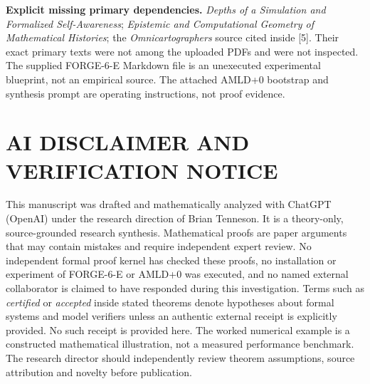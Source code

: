 \documentclass[11pt,letterpaper]{article}
\theoremstyle{definition}
\theoremstyle{remark}
\newcommand{\src}[1]{\textup{[#1]}}
\begin{document}
\noindent\textbf{Explicit missing primary dependencies.} \emph{Depths of a Simulation and Formalized Self-Awareness}; \emph{Epistemic and Computational Geometry of Mathematical Histories}; the \emph{Omnicartographers} source cited inside \src{5}. Their exact primary texts were not among the uploaded PDFs and were not inspected. The supplied FORGE-6-E Markdown file is an unexecuted experimental blueprint, not an empirical source. The attached AMLD+0 bootstrap and synthesis prompt are operating instructions, not proof evidence.

\section*{AI DISCLAIMER AND VERIFICATION NOTICE}
This manuscript was drafted and mathematically analyzed with ChatGPT (OpenAI) under the research direction of Brian Tenneson. It is a theory-only, source-grounded research synthesis. Mathematical proofs are paper arguments that may contain mistakes and require independent expert review. No independent formal proof kernel has checked these proofs, no installation or experiment of FORGE-6-E or AMLD+0 was executed, and no named external collaborator is claimed to have responded during this investigation. Terms such as \emph{certified} or \emph{accepted} inside stated theorems denote hypotheses about formal systems and model verifiers unless an authentic external receipt is explicitly provided. No such receipt is provided here. The worked numerical example is a constructed mathematical illustration, not a measured performance benchmark. The research director should independently review theorem assumptions, source attribution and novelty before publication.
\end{document}
